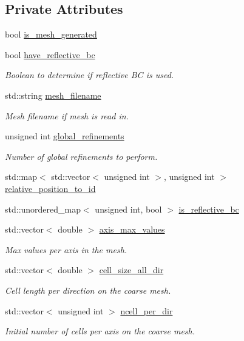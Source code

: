\subsection*{Private Attributes}
\begin{DoxyCompactItemize}
\item 
bool \hyperlink{class_mesh_generator_ad2e8abde741e4c291741cf4ee790e0e2}{is\+\_\+mesh\+\_\+generated}
\item 
bool \hyperlink{class_mesh_generator_a7d6e17f844b8026a062b93ae12b1ee40}{have\+\_\+reflective\+\_\+bc}
\begin{DoxyCompactList}\small\item\em Boolean to determine if reflective BC is used. \end{DoxyCompactList}\item 
std\+::string \hyperlink{class_mesh_generator_a1b283d2ba59b1719cab8dd191e72508a}{mesh\+\_\+filename}
\begin{DoxyCompactList}\small\item\em Mesh filename if mesh is read in. \end{DoxyCompactList}\item 
unsigned int \hyperlink{class_mesh_generator_af8fc6b25c91228ca1ccce7f1c7a2a526}{global\+\_\+refinements}
\begin{DoxyCompactList}\small\item\em Number of global refinements to perform. \end{DoxyCompactList}\item 
std\+::map$<$ std\+::vector$<$ unsigned int $>$, unsigned int $>$ \hyperlink{class_mesh_generator_a4d3e0a3f830a2fa4d35d7f269fba3b02}{relative\+\_\+position\+\_\+to\+\_\+id}
\item 
std\+::unordered\+\_\+map$<$ unsigned int, bool $>$ \hyperlink{class_mesh_generator_a5a6820b74d7cef07596e1d28a8bad8aa}{is\+\_\+reflective\+\_\+bc}
\item 
std\+::vector$<$ double $>$ \hyperlink{class_mesh_generator_ab65cdce3616c05ca7b02f88a63c7a403}{axis\+\_\+max\+\_\+values}
\begin{DoxyCompactList}\small\item\em Max values per axis in the mesh. \end{DoxyCompactList}\item 
std\+::vector$<$ double $>$ \hyperlink{class_mesh_generator_a55a1699f8cdb9418486af6b0fa3487cc}{cell\+\_\+size\+\_\+all\+\_\+dir}
\begin{DoxyCompactList}\small\item\em Cell length per direction on the coarse mesh. \end{DoxyCompactList}\item 
std\+::vector$<$ unsigned int $>$ \hyperlink{class_mesh_generator_a4d73b2d6a3f66e8a696e2228dc53fb76}{ncell\+\_\+per\+\_\+dir}
\begin{DoxyCompactList}\small\item\em Initial number of cells per axis on the coarse mesh. \end{DoxyCompactList}\end{DoxyCompactItemize}


